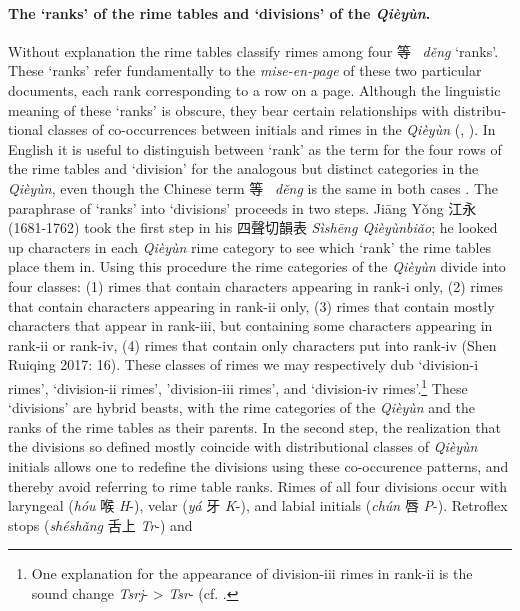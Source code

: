 \paragraph{The `ranks' of the rime tables and
`divisions' of the
 \emph{Qièyùn}.} Without explanation the rime tables
classify rimes among four 等~ \emph{děng} `ranks'. These `ranks' refer
fundamentally to the \emph{mise-en-page} of these two particular
documents, each rank corresponding to a row on a page. Although the
linguistic meaning of these `ranks' is obscure, they bear certain
relationships with dis­tri­bu­tional classes of co-occurrences between
initials and rimes in the \emph{Qièyùn} (\cite[7]{Schuessler2009minimal}, 
\cite[]{Shen2017}). In English it is useful to distinguish between `rank' as
the term for the four rows of the rime tables and `division' for the
analogous but distinct categories in the  \emph{Qièyùn}, even though the
Chinese term 等~ \emph{děng} is the same in both cases 
\citep[13]{Shen2017}. The paraphrase of `ranks' into `divisions' proceeds in two
steps. Jiāng Yǒng 江永 (1681-1762) took the first step in his 四聲切韻表
 \emph{Sìshēng Qièyùnbiǎo}; he looked up characters in each \emph{Qièyùn
}rime category to see which `rank' the rime tables place them in. Using
this procedure the rime categories of the  \emph{Qièyùn} divide into four
classes: (1) rimes that contain characters appearing in rank-i only, (2)
rimes that contain characters appearing in rank-ii only, (3) rimes that
contain mostly characters that appear in rank-iii, but containing some
characters appearing in rank-ii or rank-iv, (4) rimes that contain only
characters put into rank-iv (Shen Ruiqing 2017: 16). These classes of
rimes we may respectively dub `division-i rimes', `division-ii rimes',
'division-iii rimes', and `division-iv rimes'.\footnote{One explanation
  for the appearance of division-iii rimes in rank-ii is the sound
  change \emph{Tsrj}- \textgreater{} \emph{Tsr}- (cf. 
  \cite[267-269, 580-581]{Baxter1992}.} These `divisions' are hybrid beasts, with the rime
categories of the  \emph{Qièyùn} and the ranks of the rime tables as
their parents. In the second step, the realization that the divisions so
defined mostly coincide with dis­tri­bu­tional classes of  \emph{Qièyùn}
initials allows one to redefine the divisions using these co-occurence
patterns, and thereby avoid referring to rime table ranks. Rimes of all
four divisions occur with laryngeal (\emph{hóu} 喉 \emph{H}-), velar
(\emph{yá} 牙 \emph{K}-), and labial initials (\emph{chún }唇
 \emph{P}-). Retroflex stops (\emph{shéshǎng} 舌上 \emph{Tr}-) and

